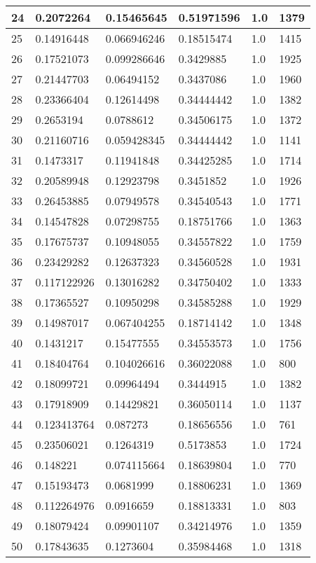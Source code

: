 \begin{longtable}{|l|l|l|l|l|l|}
24 & 0.2072264 & 0.15465645 & 0.51971596 & 1.0 & 1379 \\ \hline 
25 & 0.14916448 & 0.066946246 & 0.18515474 & 1.0 & 1415 \\ \hline 
26 & 0.17521073 & 0.099286646 & 0.3429885 & 1.0 & 1925 \\ \hline 
27 & 0.21447703 & 0.06494152 & 0.3437086 & 1.0 & 1960 \\ \hline 
28 & 0.23366404 & 0.12614498 & 0.34444442 & 1.0 & 1382 \\ \hline 
29 & 0.2653194 & 0.0788612 & 0.34506175 & 1.0 & 1372 \\ \hline 
30 & 0.21160716 & 0.059428345 & 0.34444442 & 1.0 & 1141 \\ \hline 
31 & 0.1473317 & 0.11941848 & 0.34425285 & 1.0 & 1714 \\ \hline 
32 & 0.20589948 & 0.12923798 & 0.3451852 & 1.0 & 1926 \\ \hline 
33 & 0.26453885 & 0.07949578 & 0.34540543 & 1.0 & 1771 \\ \hline 
34 & 0.14547828 & 0.07298755 & 0.18751766 & 1.0 & 1363 \\ \hline 
35 & 0.17675737 & 0.10948055 & 0.34557822 & 1.0 & 1759 \\ \hline 
36 & 0.23429282 & 0.12637323 & 0.34560528 & 1.0 & 1931 \\ \hline 
37 & 0.117122926 & 0.13016282 & 0.34750402 & 1.0 & 1333 \\ \hline 
38 & 0.17365527 & 0.10950298 & 0.34585288 & 1.0 & 1929 \\ \hline 
39 & 0.14987017 & 0.067404255 & 0.18714142 & 1.0 & 1348 \\ \hline 
40 & 0.1431217 & 0.15477555 & 0.34553573 & 1.0 & 1756 \\ \hline 
41 & 0.18404764 & 0.104026616 & 0.36022088 & 1.0 & 800 \\ \hline 
42 & 0.18099721 & 0.09964494 & 0.3444915 & 1.0 & 1382 \\ \hline 
43 & 0.17918909 & 0.14429821 & 0.36050114 & 1.0 & 1137 \\ \hline 
44 & 0.123413764 & 0.087273 & 0.18656556 & 1.0 & 761 \\ \hline 
45 & 0.23506021 & 0.1264319 & 0.5173853 & 1.0 & 1724 \\ \hline 
46 & 0.148221 & 0.074115664 & 0.18639804 & 1.0 & 770 \\ \hline 
47 & 0.15193473 & 0.0681999 & 0.18806231 & 1.0 & 1369 \\ \hline 
48 & 0.112264976 & 0.0916659 & 0.18813331 & 1.0 & 803 \\ \hline 
49 & 0.18079424 & 0.09901107 & 0.34214976 & 1.0 & 1359 \\ \hline 
50 & 0.17843635 & 0.1273604 & 0.35984468 & 1.0 & 1318 \\ \hline 
\end{longtable}